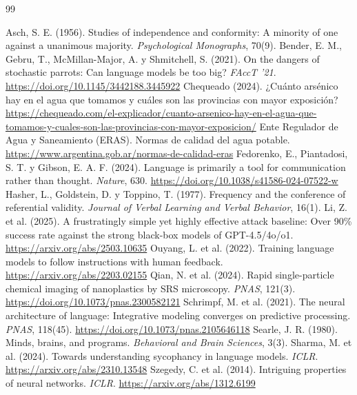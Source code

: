 \documentclass[11pt,a4paper]{article}
\begin{document}
\begin{thebibliography}{99}\small\raggedright\setlength{\itemsep}{1pt}
 Asch, S. E. (1956). Studies of independence and conformity: A minority of one against a unanimous majority. \emph{Psychological Monographs}, 70(9).
 Bender, E. M., Gebru, T., McMillan-Major, A. y Shmitchell, S. (2021). On the dangers of stochastic parrots: Can language models be too big? \emph{FAccT '21}. \url{https://doi.org/10.1145/3442188.3445922}
 Chequeado (2024). ¿Cuánto arsénico hay en el agua que tomamos y cuáles son las provincias con mayor exposición? \url{https://chequeado.com/el-explicador/cuanto-arsenico-hay-en-el-agua-que-tomamos-y-cuales-son-las-provincias-con-mayor-exposicion/}
 Ente Regulador de Agua y Saneamiento (ERAS). Normas de calidad del agua potable. \url{https://www.argentina.gob.ar/normas-de-calidad-eras}
 Fedorenko, E., Piantadosi, S. T. y Gibson, E. A. F. (2024). Language is primarily a tool for communication rather than thought. \emph{Nature}, 630. \url{https://doi.org/10.1038/s41586-024-07522-w}
 Hasher, L., Goldstein, D. y Toppino, T. (1977). Frequency and the conference of referential validity. \emph{Journal of Verbal Learning and Verbal Behavior}, 16(1).
 Li, Z. et al. (2025). A frustratingly simple yet highly effective attack baseline: Over 90\% success rate against the strong black-box models of GPT-4.5/4o/o1. \url{https://arxiv.org/abs/2503.10635}
 Ouyang, L. et al. (2022). Training language models to follow instructions with human feedback. \url{https://arxiv.org/abs/2203.02155}
 Qian, N. et al. (2024). Rapid single-particle chemical imaging of nanoplastics by SRS microscopy. \emph{PNAS}, 121(3). \url{https://doi.org/10.1073/pnas.2300582121}
 Schrimpf, M. et al. (2021). The neural architecture of language: Integrative modeling converges on predictive processing. \emph{PNAS}, 118(45). \url{https://doi.org/10.1073/pnas.2105646118}
 Searle, J. R. (1980). Minds, brains, and programs. \emph{Behavioral and Brain Sciences}, 3(3).
 Sharma, M. et al. (2024). Towards understanding sycophancy in language models. \emph{ICLR}. \url{https://arxiv.org/abs/2310.13548}
 Szegedy, C. et al. (2014). Intriguing properties of neural networks. \emph{ICLR}. \url{https://arxiv.org/abs/1312.6199}
\end{thebibliography}

\clearpage

\end{document}
